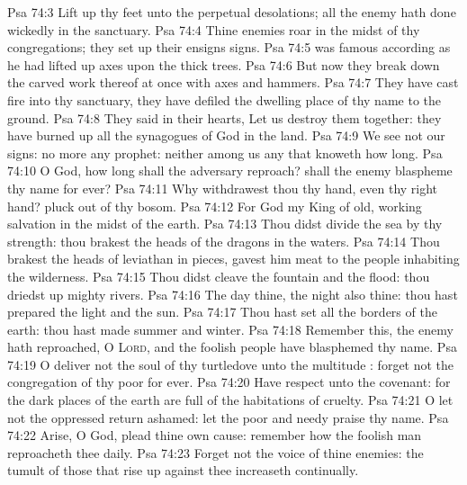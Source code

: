 \vs Psa 74:3 Lift up thy feet unto the perpetual desolations;  all  the enemy hath done wickedly in the sanctuary.
\vs Psa 74:4 Thine enemies roar in the midst of thy congregations; they set up their ensigns  signs.
\vs Psa 74:5  was famous according as he had lifted up axes upon the thick trees.
\vs Psa 74:6 But now they break down the carved work thereof at once with axes and hammers.
\vs Psa 74:7 They have cast fire into thy sanctuary, they have defiled  the dwelling place of thy name to the ground.
\vs Psa 74:8 They said in their hearts, Let us destroy them together: they have burned up all the synagogues of God in the land.
\vs Psa 74:9 We see not our signs:  no more any prophet: neither  among us any that knoweth how long.
\vs Psa 74:10 O God, how long shall the adversary reproach? shall the enemy blaspheme thy name for ever?
\vs Psa 74:11 Why withdrawest thou thy hand, even thy right hand? pluck  out of thy bosom.
\vs Psa 74:12 For God  my King of old, working salvation in the midst of the earth.
\vs Psa 74:13 Thou didst divide the sea by thy strength: thou brakest the heads of the dragons in the waters.
\vs Psa 74:14 Thou brakest the heads of leviathan in pieces,  gavest him  meat to the people inhabiting the wilderness.
\vs Psa 74:15 Thou didst cleave the fountain and the flood: thou driedst up mighty rivers.
\vs Psa 74:16 The day  thine, the night also  thine: thou hast prepared the light and the sun.
\vs Psa 74:17 Thou hast set all the borders of the earth: thou hast made summer and winter.
\vs Psa 74:18 Remember this,  the enemy hath reproached, O \textsc{Lord}, and  the foolish people have blasphemed thy name.
\vs Psa 74:19 O deliver not the soul of thy turtledove unto the multitude : forget not the congregation of thy poor for ever.
\vs Psa 74:20 Have respect unto the covenant: for the dark places of the earth are full of the habitations of cruelty.
\vs Psa 74:21 O let not the oppressed return ashamed: let the poor and needy praise thy name.
\vs Psa 74:22 Arise, O God, plead thine own cause: remember how the foolish man reproacheth thee daily.
\vs Psa 74:23 Forget not the voice of thine enemies: the tumult of those that rise up against thee increaseth continually.
